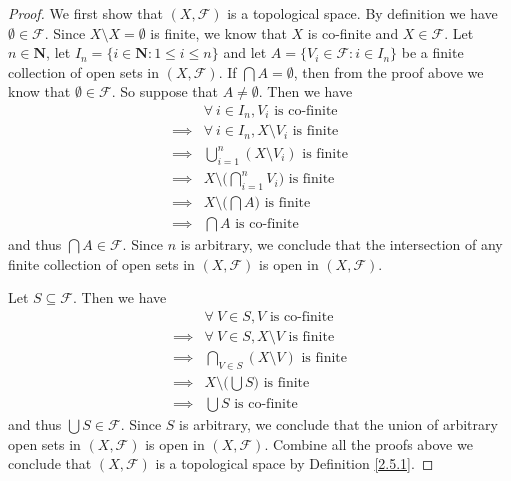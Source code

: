\begin{proof}
    We first show that \((X, \mathcal{F})\) is a topological space.
    By definition we have \(\emptyset \in \mathcal{F}\).
    Since \(X \setminus X = \emptyset\) is finite, we know that \(X\) is co-finite and \(X \in \mathcal{F}\).
    Let \(n \in \mathbf{N}\), let \(I_n = \{i \in \mathbf{N} : 1 \leq i \leq n\}\) and let \(A = \{V_i \in \mathcal{F} : i \in I_n\}\) be a finite collection of open sets in \((X, \mathcal{F})\).
    If \(\bigcap A = \emptyset\), then from the proof above we know that \(\emptyset \in \mathcal{F}\).
    So suppose that \(A \neq \emptyset\).
    Then we have
    \begin{align*}
                 & \forall\ i \in I_n, V_i \text{ is co-finite}                    \\
        \implies & \forall\ i \in I_n, X \setminus V_i \text{ is finite}           \\
        \implies & \bigcup_{i = 1}^n (X \setminus V_i) \text{ is finite}           \\
        \implies & X \setminus \bigg(\bigcap_{i = 1}^n V_i\bigg) \text{ is finite} \\
        \implies & X \setminus \bigg(\bigcap A\bigg) \text{ is finite}             \\
        \implies & \bigcap A \text{ is co-finite}
    \end{align*}
    and thus \(\bigcap A \in \mathcal{F}\).
    Since \(n\) is arbitrary, we conclude that the intersection of any finite collection of open sets in \((X, \mathcal{F})\) is open in \((X, \mathcal{F})\).

    Let \(S \subseteq \mathcal{F}\).
    Then we have
    \begin{align*}
                 & \forall\ V \in S, V \text{ is co-finite}            \\
        \implies & \forall\ V \in S, X \setminus V \text{ is finite}   \\
        \implies & \bigcap_{V \in S} (X \setminus V) \text{ is finite} \\
        \implies & X \setminus \bigg(\bigcup S\bigg) \text{ is finite} \\
        \implies & \bigcup S \text{ is co-finite}
    \end{align*}
    and thus \(\bigcup S \in \mathcal{F}\).
    Since \(S\) is arbitrary, we conclude that the union of arbitrary open sets in \((X, \mathcal{F})\) is open in \((X, \mathcal{F})\).
    Combine all the proofs above we conclude that \((X, \mathcal{F})\) is a topological space by Definition \ref{2.5.1}.


\end{proof}
